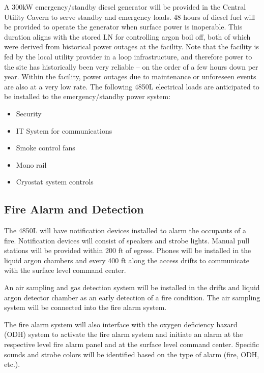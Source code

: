 A 300kW emergency/standby diesel generator will be provided in the Central Utility Cavern to serve standby and emergency loads. 48 hours of diesel fuel will be provided to operate the generator when surface power is inoperable. This duration aligns with the stored LN for controlling argon boil off, both of which were derived from historical power outages at the facility.  Note that the facility is fed by the local utility provider in a loop infrastructure, and therefore power to the site has historically been very reliable -- on the order of a few hours down per year.  Within the facility, power outages due to maintenance or unforeseen events are also at a very low rate.  The following 4850L electrical loads are anticipated to be installed to the emergency/standby power system:

\begin{itemize}
\item Security
\item IT System for communications
\item Smoke control fans
\item Mono rail
\item Cryostat system controls
\end{itemize}

\subsection{Fire Alarm and Detection}
\label{sec:fscf-und-fire-alarm}

The 4850L will have notification devices installed to alarm the occupants of a fire. Notification devices will consist of speakers and strobe lights. Manual pull stations will be provided within 200 ft of egress. Phones will be installed in the liquid argon chambers and every 400 ft along the access drifts to communicate with the surface level command center.

An air sampling and gas detection system will be installed in the drifts and liquid argon detector chamber as an early detection of a fire condition. The air sampling system will be connected into the fire alarm system.

The fire alarm system will also interface with the oxygen deficiency hazard (ODH) system to activate the fire alarm system and initiate an alarm at the respective level fire alarm panel and at the surface level command center. Specific sounds and strobe colors will be identified based on the type of alarm (fire, ODH, etc.).

